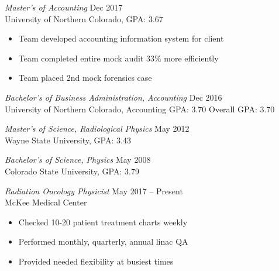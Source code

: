 \documentclass[10pt]{article}
\begin{document}
\begin{description}[leftmargin=!,labelwidth=3cm,align=left,itemsep=-9px,partopsep=-5px]

%
%

%
%
\item[Education]
    \textit{Master's of Accounting} \hfill Dec 2017\\
    University of Northern Colorado, GPA: 3.67
    \begin{itemize}[rightmargin=2cm,noitemsep]%
        \item Team developed accounting information system for client
        \item Team completed entire mock audit 33\% more efficiently
        \item Team placed 2nd mock forensics case
    \end{itemize}

    \textit{Bachelor's of Business Administration, Accounting} \hfill Dec 2016\\
    University of Northern Colorado, Accounting GPA: 3.70 \quad Overall GPA: 3.70

    \textit{Master's of Science, Radiological Physics} \hfill May 2012\\
    Wayne State University, GPA: 3.43

    \textit{Bachelor's of Science, Physics} \hfill May 2008\\
    Colorado State University, GPA: 3.79
\item[\rule{196mm}{0.5pt}]

%
%
\item[Experience]
    \textit{Radiation Oncology Physicist} \hfill May 2017 -- Present\\
    McKee Medical Center
    \begin{itemize}[rightmargin=2cm,noitemsep]%
        \item Checked 10-20 patient treatment charts weekly
        \item Performed monthly, quarterly, annual linac QA
        \item Provided needed flexibility at busiest times
    \end{itemize}


\end{description}
\end{document}
